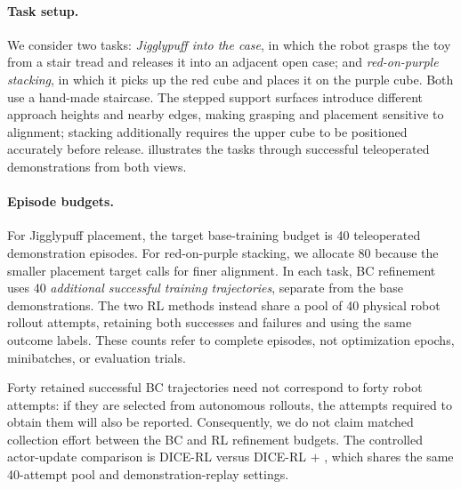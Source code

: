 \paragraph{Task setup.}
We consider two tasks:
\emph{Jigglypuff into the case}, in which the robot grasps the toy from a stair
tread and releases it into an adjacent open case; and \emph{red-on-purple
stacking}, in which it picks up the red cube and places it on the purple cube.
Both use a hand-made staircase. The stepped support surfaces introduce
different approach heights and nearby edges, making grasping and placement
sensitive to alignment; stacking additionally requires the upper cube to be
positioned accurately before release.  illustrates
the tasks through successful teleoperated demonstrations from both views.

\paragraph{Episode budgets.}
For Jigglypuff placement, the target base-training budget is 40 teleoperated
demonstration episodes. For red-on-purple stacking, we allocate 80 because
the smaller placement target calls for finer alignment. In each task,
BC refinement uses 40 \emph{additional successful training trajectories},
separate from the base demonstrations. The two RL methods instead share a
pool of 40 physical robot rollout attempts, retaining both successes and
failures and using the same outcome labels. These counts refer to complete
episodes, not optimization epochs, minibatches, or evaluation trials.

Forty retained successful BC trajectories need not correspond to forty robot
attempts: if they are selected from autonomous rollouts, the attempts required
to obtain them will also be reported. Consequently, we do not claim matched
collection effort between the BC and RL refinement budgets. The controlled
actor-update comparison is DICE-RL versus DICE-RL $+$ \method{}, which shares
the same 40-attempt pool and demonstration-replay settings.


